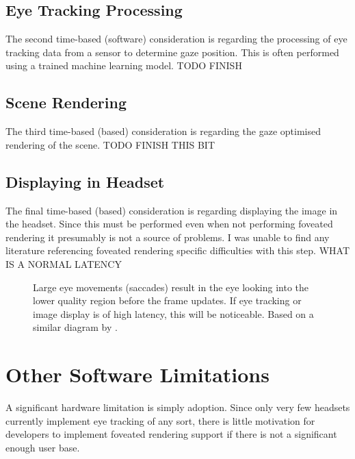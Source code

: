 \documentclass[a4paper,11pt]{article}
\begin{document}
\subsection{Eye Tracking Processing}
The second time-based (software) consideration is regarding the processing of eye tracking data from a sensor to determine gaze position. This is often performed using a trained machine learning model. TODO FINISH

\subsection{Scene Rendering}
The third time-based (based) consideration is regarding the gaze optimised rendering of the scene. TODO FINISH THIS BIT

\subsection{Displaying in Headset}
The final time-based (based) consideration is regarding displaying the image in the headset. Since this must be performed even when not performing foveated rendering it presumably is not a source of problems. I was unable to find any literature referencing foveated rendering specific difficulties with this step. WHAT IS A NORMAL LATENCY

\begin{figure}
  \begin{center}
    
    \caption{Large eye movements (saccades) result in the eye looking into the lower quality region before the frame updates. If eye tracking or image display is of high latency, this will be noticeable. Based on a similar diagram by \textcite{albert2017latency}.}
    \label{fig:eye}
  \end{center}
\end{figure}

\section{Other Software Limitations}
A significant hardware limitation is simply adoption. Since only very few headsets currently implement eye tracking of any sort, there is little motivation for developers to implement foveated rendering support if there is not a significant enough user base.
\end{document}
